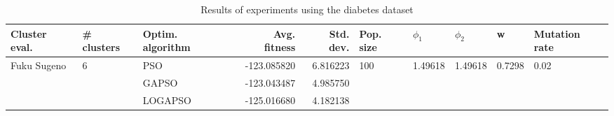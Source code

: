 \begin{table}
\centering
\caption{Results of experiments using the diabetes dataset}
\begin{tabular}{lllrrlllll}
\toprule
               Cluster eval. &        \# clusters & Optim. algorithm &  Avg. fitness &  Std. dev. &            Pop. size &               $\phi_{1}$ &               $\phi_{2}$ &                       w &         Mutation rate \\
\midrule
\multirow{3}{*}{Fuku Sugeno} & \multirow{3}{*}{6} &              PSO &   -123.085820 &   6.816223 & \multirow{3}{*}{100} & \multirow{3}{*}{1.49618} & \multirow{3}{*}{1.49618} & \multirow{3}{*}{0.7298} & \multirow{3}{*}{0.02} \\
                             &                    &            GAPSO &   -123.043487 &   4.985750 &                      &                          &                          &                         &                       \\
                             &                    &          LOGAPSO &   -125.016680 &   4.182138 &                      &                          &                          &                         &                       \\
\bottomrule
\end{tabular}
\end{table}
